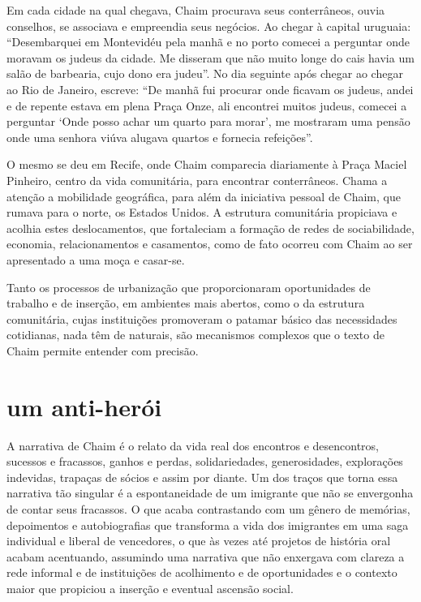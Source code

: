 Em cada cidade na qual chegava, Chaim procurava seus conterrâneos, ouvia
conselhos, se associava e empreendia seus negócios. Ao chegar à capital
uruguaia: ``Desembarquei em Montevidéu pela manhã e no porto comecei a
perguntar onde moravam os judeus da cidade. Me disseram que não muito
longe do cais havia um salão de barbearia, cujo dono era judeu''. No dia
seguinte após chegar ao chegar ao Rio de Janeiro, escreve: ``De manhã
fui procurar onde ficavam os judeus, andei e de repente estava em plena
Praça Onze, ali encontrei muitos judeus, comecei a perguntar `Onde posso
achar um quarto para morar', me mostraram uma pensão onde uma senhora
viúva alugava quartos e fornecia refeições''. 

O mesmo se deu em Recife,
onde Chaim comparecia diariamente à Praça Maciel Pinheiro, centro da
vida comunitária, para encontrar conterrâneos. Chama a atenção a
mobilidade geográfica, para além da iniciativa pessoal de Chaim, que
rumava para o norte, os Estados Unidos. A estrutura comunitária
propiciava e acolhia estes deslocamentos, que fortaleciam a formação de
redes de sociabilidade, economia, relacionamentos e casamentos, como de
fato ocorreu com Chaim ao ser apresentado a uma moça e casar-se.

Tanto os processos de urbanização que proporcionaram oportunidades de
trabalho e de inserção, em ambientes mais abertos, como o da estrutura
comunitária, cujas instituições promoveram o patamar básico das
necessidades cotidianas, nada têm de naturais, são mecanismos complexos
que o texto de Chaim permite entender com precisão.

\section{um anti-herói}

A narrativa de Chaim é o relato da vida real dos encontros e
desencontros, sucessos e fracassos, ganhos e perdas, solidariedades,
generosidades, explorações indevidas, trapaças de sócios e assim por
diante. Um dos traços que torna essa narrativa tão singular é a
espontaneidade de um imigrante que não se envergonha de contar seus
fracassos. O que acaba contrastando com um gênero de memórias,
depoimentos e autobiografias que transforma a vida dos imigrantes em uma
saga individual e liberal de vencedores, o que às vezes até projetos de
história oral acabam acentuando, assumindo uma narrativa que não
enxergava com clareza a rede informal e de instituições de acolhimento e
de oportunidades e o contexto maior que propiciou a inserção e eventual
ascensão social.

